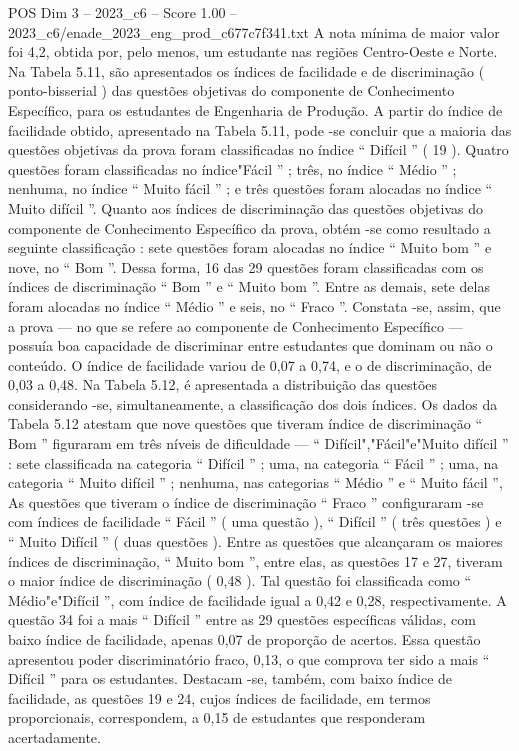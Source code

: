 \begin{textsample}{POS Dim 3 – 2023\_c6 – Score 1.00 – 2023\_c6/enade\_2023\_eng\_prod\_c677c7f341.txt}
A nota mínima de maior valor foi 4,2, obtida por, pelo menos, um estudante nas regiões Centro-Oeste e Norte.
Na Tabela 5.11, são apresentados os índices de facilidade e de discriminação ( ponto-bisserial ) das questões objetivas do componente de Conhecimento Específico, para os estudantes de Engenharia de Produção.
A partir do índice de facilidade obtido, apresentado na Tabela 5.11, pode -se concluir que a maioria das questões objetivas da prova foram classificadas no índice “ Difícil ” ( 19 ).
Quatro questões foram classificadas no índice"Fácil ” ; três, no índice “ Médio ” ; nenhuma, no índice “ Muito fácil ” ; e três questões foram alocadas no índice “ Muito difícil ”.
Quanto aos índices de discriminação das questões objetivas do componente de Conhecimento Específico da prova, obtém -se como resultado a seguinte classificação : sete questões foram alocadas no índice “ Muito bom ” e nove, no “ Bom ”.
Dessa forma, 16 das 29 questões foram classificadas com os índices de discriminação “ Bom ” e “ Muito bom ”.
Entre as demais, sete delas foram alocadas no índice “ Médio ” e seis, no “ Fraco ”.
Constata -se, assim, que a prova — no que se refere ao componente de Conhecimento Específico — possuía boa capacidade de discriminar entre estudantes que dominam ou não o conteúdo.
O índice de facilidade variou de 0,07 a 0,74, e o de discriminação, de 0,03 a 0,48.
Na Tabela 5.12, é apresentada a distribuição das questões considerando -se, simultaneamente, a classificação dos dois índices.
Os dados da Tabela 5.12 atestam que nove questões que tiveram índice de discriminação “ Bom ” figuraram em três níveis de dificuldade — “ Difícil","Fácil"e"Muito difícil ” : sete classificada na categoria “ Difícil ” ; uma, na categoria “ Fácil ” ; uma, na categoria “ Muito difícil ” ; nenhuma, nas categorias “ Médio ” e “ Muito fácil ”, As questões que tiveram o índice de discriminação “ Fraco ” configuraram -se com índices de facilidade “ Fácil ” ( uma questão ), “ Difícil ” ( três questões ) e “ Muito Difícil ” ( duas questões ).
Entre as questões que alcançaram os maiores índices de discriminação, “ Muito bom ”, entre elas, as questões 17 e 27, tiveram o maior índice de discriminação ( 0,48 ).
Tal questão foi classificada como “ Médio"e"Difícil ”, com índice de facilidade igual a 0,42 e 0,28, respectivamente.
A questão 34 foi a mais “ Difícil ” entre as 29 questões específicas válidas, com baixo índice de facilidade, apenas 0,07 de proporção de acertos.
Essa questão apresentou poder discriminatório fraco, 0,13, o que comprova ter sido a mais “ Difícil ” para os estudantes.
Destacam -se, também, com baixo índice de facilidade, as questões 19 e 24, cujos índices de facilidade, em termos proporcionais, correspondem, a 0,15 de estudantes que responderam acertadamente.

\end{textsample}
